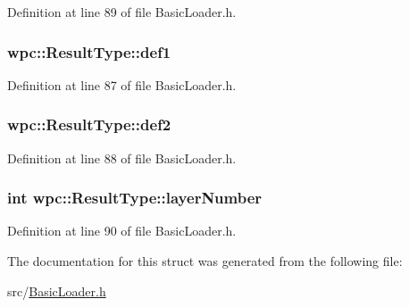 Definition at line 89 of file Basic\-Loader.\-h.

\hypertarget{structwpc_1_1_result_type_acb358c96a9b53ed4dea03850919fd401}{
\subsubsection[{def1}]{ wpc\-::\-Result\-Type\-::def1}}\label{structwpc_1_1_result_type_acb358c96a9b53ed4dea03850919fd401}


Definition at line 87 of file Basic\-Loader.\-h.

\hypertarget{structwpc_1_1_result_type_a7d4052263b6c8db4579abcbd3d75104a}{
\subsubsection[{def2}]{ wpc\-::\-Result\-Type\-::def2}}\label{structwpc_1_1_result_type_a7d4052263b6c8db4579abcbd3d75104a}


Definition at line 88 of file Basic\-Loader.\-h.

\hypertarget{structwpc_1_1_result_type_a2745cac2ffc4941b333aefca7f97368c}{
\subsubsection[{layer\-Number}]{\setlength{\rightskip}{0pt plus 5cm}int wpc\-::\-Result\-Type\-::layer\-Number}}\label{structwpc_1_1_result_type_a2745cac2ffc4941b333aefca7f97368c}


Definition at line 90 of file Basic\-Loader.\-h.



The documentation for this struct was generated from the following file\-:\begin{DoxyCompactItemize}
\item 
src/\hyperlink{_basic_loader_8h}{Basic\-Loader.\-h}\end{DoxyCompactItemize}
